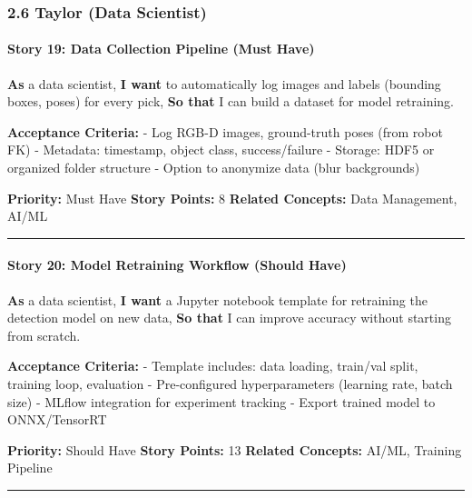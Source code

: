 \documentclass[
]{article}
\begin{document}
\hypertarget{taylor-data-scientist}{%
\subsubsection{2.6 Taylor (Data
Scientist)}\label{taylor-data-scientist}}

\hypertarget{story-19-data-collection-pipeline-must-have}{%
\paragraph{Story 19: Data Collection Pipeline (Must
Have)}\label{story-19-data-collection-pipeline-must-have}}

\textbf{As} a data scientist, \textbf{I want} to automatically log
images and labels (bounding boxes, poses) for every pick, \textbf{So
that} I can build a dataset for model retraining.

\textbf{Acceptance Criteria:} - Log RGB-D images, ground-truth poses
(from robot FK) - Metadata: timestamp, object class, success/failure -
Storage: HDF5 or organized folder structure - Option to anonymize data
(blur backgrounds)

\textbf{Priority:} Must Have \textbf{Story Points:} 8 \textbf{Related
Concepts:} Data Management, AI/ML

\begin{center}\rule{0.5\linewidth}{0.5pt}\end{center}

\hypertarget{story-20-model-retraining-workflow-should-have}{%
\paragraph{Story 20: Model Retraining Workflow (Should
Have)}\label{story-20-model-retraining-workflow-should-have}}

\textbf{As} a data scientist, \textbf{I want} a Jupyter notebook
template for retraining the detection model on new data, \textbf{So
that} I can improve accuracy without starting from scratch.

\textbf{Acceptance Criteria:} - Template includes: data loading,
train/val split, training loop, evaluation - Pre-configured
hyperparameters (learning rate, batch size) - MLflow integration for
experiment tracking - Export trained model to ONNX/TensorRT

\textbf{Priority:} Should Have \textbf{Story Points:} 13 \textbf{Related
Concepts:} AI/ML, Training Pipeline

\begin{center}\rule{0.5\linewidth}{0.5pt}\end{center}
\end{document}
